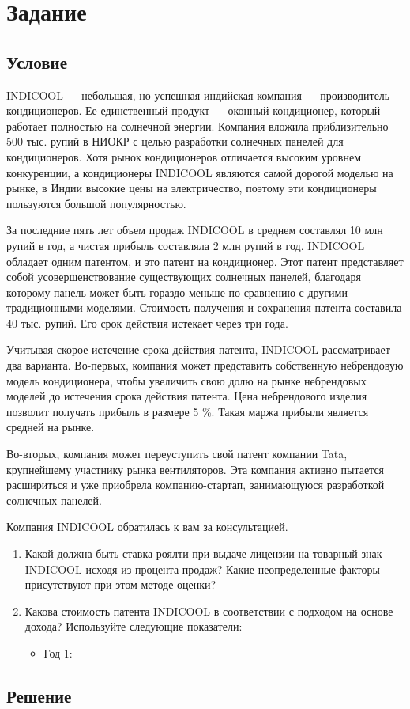 \documentclass[12pt]{article}
\newenvironment{e}[1][dummy label]{
    \section{Задание}\label{#1}
    \subsection*{Условие}
    }{
    \subsection*{Решение}
}
\begin{document}
    \newpage
    \begin{e}
        INDICOOL --- небольшая, но успешная индийская компания --- производитель кондиционеров. Ее единственный продукт --- оконный кондиционер, который работает полностью на солнечной энергии. Компания вложила приблизительно 500 тыс. рупий в НИОКР с целью разработки солнечных панелей для кондиционеров. Хотя рынок кондиционеров отличается высоким уровнем конкуренции, а кондиционеры INDICOOL являются самой дорогой моделью на рынке, в Индии высокие цены на электричество, поэтому эти кондиционеры пользуются большой популярностью.

        За последние пять лет объем продаж INDICOOL в среднем составлял 10 млн рупий в год, а чистая прибыль составляла 2 млн рупий в год. INDICOOL обладает одним патентом, и это патент на кондиционер. Этот патент представляет собой усовершенствование существующих солнечных панелей, благодаря которому панель может быть гораздо меньше по сравнению с другими традиционными моделями. Стоимость получения и сохранения патента составила 40 тыс. рупий. Его срок действия истекает через три года.

        Учитывая скорое истечение срока действия патента, INDICOOL рассматривает два варианта. Во-первых, компания может представить собственную небрендовую модель кондиционера, чтобы увеличить свою долю на рынке небрендовых моделей до истечения срока действия патента. Цена небрендового изделия позволит получать прибыль в размере 5 \%. Такая маржа прибыли является средней на рынке.

        Во-вторых, компания может переуступить свой патент компании Tata, крупнейшему участнику рынка вентиляторов. Эта компания активно пытается расшириться и уже приобрела компанию-стартап, занимающуюся разработкой солнечных панелей.

        Компания INDICOOL обратилась к вам за консультацией.

        \begin{enumerate}
            \item Какой должна быть ставка роялти при выдаче лицензии на товарный знак INDICOOL исходя из процента продаж? Какие неопределенные факторы присутствуют при этом методе оценки?

            \newpage

            \item Какова стоимость патента INDICOOL в соответствии с подходом на основе дохода? Используйте следующие показатели:
            \begin{itemize}
                \item Год 1:


\end{itemize}
\end{enumerate}
\end{e}
\end{document}
